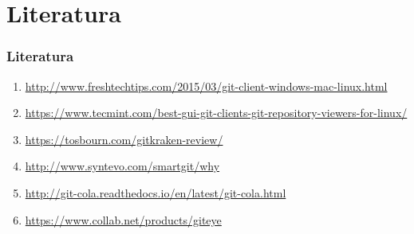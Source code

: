 \section{Literatura}
\begin{frame}[allowframebreaks]
\frametitle{Literatura}
 
\begin{enumerate}
 \item \url{http://www.freshtechtips.com/2015/03/git-client-windows-mac-linux.html}
 \item \url{https://www.tecmint.com/best-gui-git-clients-git-repository-viewers-for-linux/}
 \item \url{https://tosbourn.com/gitkraken-review/}
 \item \url{http://www.syntevo.com/smartgit/why}
 \item \url{http://git-cola.readthedocs.io/en/latest/git-cola.html}
 \item \url{https://www.collab.net/products/giteye}
\end{enumerate}


\end{frame}

